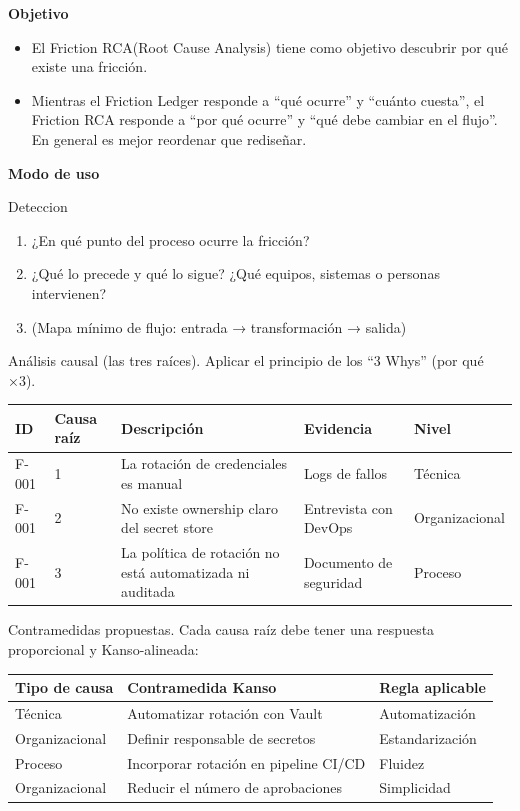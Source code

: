 \textbf{Objetivo} 
\begin{itemize}
    \item El Friction RCA(Root Cause Analysis) tiene como objetivo descubrir por qué existe una fricción.
    \item Mientras el Friction Ledger responde a ``qué ocurre'' y ``cuánto cuesta'', el Friction RCA responde a ``por qué ocurre'' y ``qué debe cambiar en el flujo''. En general es mejor reordenar que rediseñar.
\end{itemize}


\textbf{Modo de uso}

Deteccion 
\begin{enumerate}
    \item ¿En qué punto del proceso ocurre la fricción?
    \item ¿Qué lo precede y qué lo sigue? ¿Qué equipos, sistemas o personas intervienen?
    \item (Mapa mínimo de flujo: entrada → transformación → salida)
\end{enumerate}

Análisis causal (las tres raíces). Aplicar el principio de los ``3 Whys'' (por qué ×3).

\begin{center}
\begin{tabular}{l|l|p{5cm}|p{4cm}|p{3cm}|}
\hline
ID & Causa raíz & Descripción & Evidencia & Nivel \\ \hline
F-001 & 1 & La rotación de credenciales es manual & Logs de fallos & Técnica \\ \hline
F-001 & 2 & No existe ownership claro del secret store & Entrevista con DevOps & Organizacional \\ \hline
F-001 & 3 & La política de rotación no está automatizada ni auditada & Documento de seguridad & Proceso \\ \hline
\end{tabular}
\end{center}

Contramedidas propuestas. Cada causa raíz debe tener una respuesta proporcional y Kanso-alineada:

\begin{center}
\begin{tabular}{|p{3.5cm}|p{5cm}|p{3.5cm}|}
\hline
Tipo de causa & Contramedida Kanso & Regla aplicable \\ \hline
Técnica & Automatizar rotación con Vault & Automatización \\ \hline
Organizacional & Definir responsable de secretos & Estandarización \\ \hline
Proceso & Incorporar rotación en pipeline CI/CD & Fluidez \\ \hline
Organizacional & Reducir el número de aprobaciones & Simplicidad \\ \hline
\end{tabular}
\end{center}

